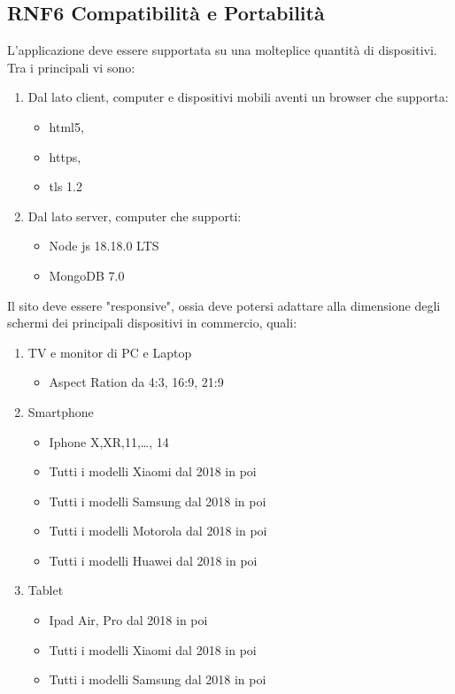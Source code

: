 \documentclass{report}
\begin{document}
\subsection*{RNF6 Compatibilità e Portabilità}
L'applicazione deve essere supportata su una molteplice quantità di dispositivi.
Tra i principali vi sono:
\begin{enumerate}
	\item Dal lato client, computer e dispositivi mobili aventi un browser che supporta:
    \begin{itemize}
		\item html5,
		\item https,
		\item tls 1.2
	\end{itemize}
	\item Dal lato server, computer che supporti:
	\begin{itemize}
		\item Node js 18.18.0 LTS
		\item MongoDB 7.0
	\end{itemize}
\end{enumerate}
Il sito deve essere "responsive", ossia deve potersi adattare alla dimensione degli schermi dei principali dispositivi in commercio, quali:
\begin{enumerate}
	\item TV e monitor di PC e Laptop 
	\begin{itemize}
		\item Aspect Ration da 4:3, 16:9, 21:9
	\end{itemize}
	\item Smartphone
	\begin{itemize}
		\item Iphone X,XR,11,\dots , 14
		\item Tutti i modelli Xiaomi dal 2018 in poi 
		\item Tutti i modelli Samsung dal 2018 in poi
		\item Tutti i modelli Motorola dal 2018 in poi 
		\item Tutti i modelli Huawei dal 2018 in poi 
	\end{itemize}
	\item Tablet 
	\begin{itemize}
		\item Ipad Air, Pro dal 2018 in poi
		\item Tutti i modelli Xiaomi dal 2018 in poi
		\item Tutti i modelli Samsung dal 2018 in poi
	\end{itemize}
\end{enumerate}
\end{document}
